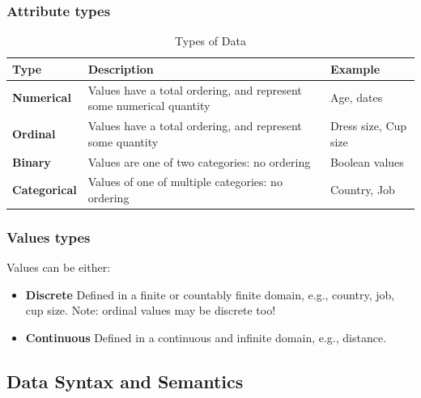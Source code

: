 \subsubsection{Attribute types}
\begin{table}[h!]
\centering
{} %
\begin{tabular}{lll}
\toprule
\textbf{Type} & \textbf{Description} & \textbf{Example} \\
\midrule
\textbf{Numerical}   & Values have a total ordering, and represent some numerical quantity & Age, dates \\
\textbf{Ordinal}     & Values have a total ordering, and represent some quantity           & Dress size, Cup size \\
\textbf{Binary}      & Values are one of two categories: no ordering                       & Boolean values \\
\textbf{Categorical} & Values of one of multiple categories: no ordering                   & Country, Job \\
\bottomrule
\end{tabular}
\caption{Types of Data}
\end{table}

\subsubsection{Values types}
Values can be either:
\begin{itemize}
   \item \textbf{Discrete}
   Defined in a finite or countably finite domain, e.g., country, job, cup size. Note: ordinal values may be discrete too!
   \item \textbf{Continuous}
   Defined in a continuous and infinite domain, e.g., distance.
\end{itemize}

\subsection{Data Syntax and Semantics}

